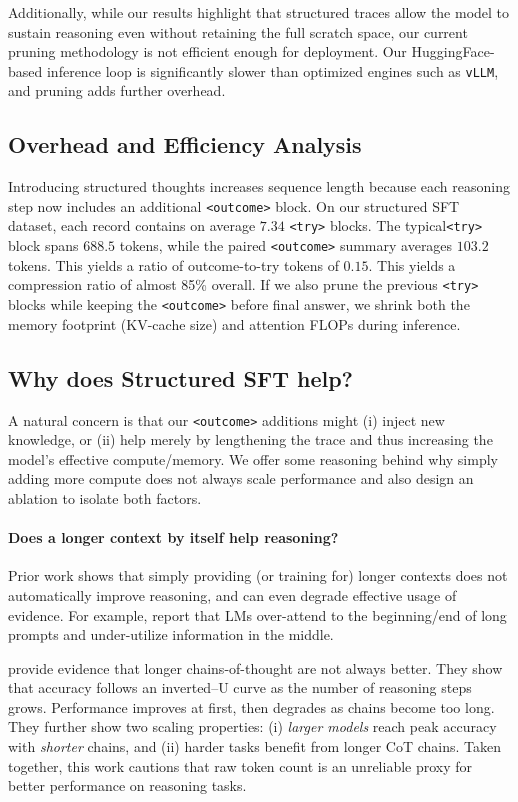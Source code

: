 \documentclass{article}
\begin{document}
Additionally, while our results highlight that structured traces allow the model to sustain reasoning even without retaining the full scratch space, our current pruning methodology is not efficient enough for deployment. Our HuggingFace-based inference loop is significantly slower than optimized engines such as \texttt{vLLM}, and pruning adds further overhead. 

\subsection{Overhead and Efficiency Analysis}
Introducing structured thoughts increases sequence length because each reasoning step now includes an additional \texttt{<outcome>} block. On our structured SFT dataset, each record contains on average $7.34$ \texttt{<try>} blocks. The typical\texttt{<try>} block spans $688.5$ tokens, while the paired \texttt{<outcome>} summary averages $103.2$ tokens. This yields a ratio of outcome-to-try tokens of $0.15$. This yields a compression ratio of almost 85\% overall. If we also prune the previous \texttt{<try>} blocks while keeping the \texttt{<outcome>} before final answer, we shrink both the memory footprint (KV-cache size) and attention FLOPs during inference.


\subsection{Why does Structured SFT help?}
A natural concern is that our \texttt{<outcome>} additions might (i) inject new knowledge, or (ii) help merely by lengthening the trace and thus increasing the model’s effective compute/memory. We offer some reasoning behind why simply adding more compute does not always scale performance and also design an ablation to isolate both factors.

\paragraph{Does a longer context by itself help reasoning?}
Prior work shows that simply providing (or training for) longer contexts does not automatically improve reasoning, and can even degrade effective usage of evidence. For example, \citet{liu2023lost} report that LMs over-attend to the beginning/end of long prompts and under-utilize information in the middle. 

\citet{wu2025more} provide evidence that longer chains-of-thought are not always better. They show that accuracy follows an inverted–U curve as the number of reasoning steps grows. Performance improves at first, then degrades as chains become too long. They further show two scaling properties: (i) \emph{larger models} reach peak accuracy with \emph{shorter} chains, and (ii) harder tasks benefit from longer CoT chains. Taken together, this work cautions that raw token count is an unreliable proxy for better performance on reasoning tasks.
\end{document}
